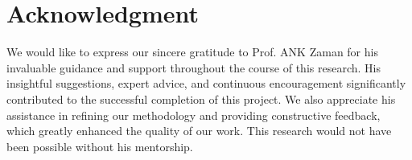 \documentclass{ieeeaccess}
\begin{document}
\section*{Acknowledgment}
We would like to express our sincere gratitude to Prof. ANK Zaman for his invaluable guidance and support throughout the course of this research. His insightful suggestions, expert advice, and continuous encouragement significantly contributed to the successful completion of this project. We also appreciate his assistance in refining our methodology and providing constructive feedback, which greatly enhanced the quality of our work. This research would not have been possible without his mentorship.

\balance



%
%
%
%
%
%
%
%
%
%
\end{document}
